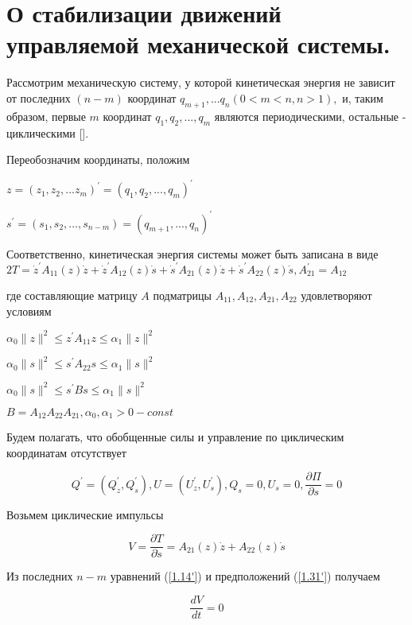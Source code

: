 \section{О стабилизации движений управляемой механической системы.} \label{p13}

Рассмотрим механическую систему, у которой кинетическая энергия не зависит от последних $(n-m)$ координат $q_{m+1},... q_n (0 < m < n, n > 1),$ и, таким образом, первые $m$ координат $q_1, q_2, ... , q_m$ являются периодическими, остальные - циклическими [].

Переобозначим координаты, положим

$z = (z_1, z_2, ... z_m)^{'} = (q_1, q_2, ..., q_m)^{'}$

$s^{'} = (s_1, s_2, ... , s_{n-m}) = (q_{m + 1}, ..., q_n)^{'}$

Соответственно, кинетическая энергия системы может быть записана в виде $2T = \dot z^{'} A_{11} (z) \dot z + \dot z^{'} A_{12} (z) \dot s + \dot s^{'} A_{21} (z) \dot z + \dot s^{'} A_{22} (z) \dot s, A_21^{'} = A_{12}$

где составляющие матрицу $A$ подматрицы $A_{11}, A_{12}, A_{21}, A_{22}$ удовлетворяют условиям 

$\alpha_0 \| z \|^2 \le z^{'} A_{11} z \le \alpha_1  \| z \|^2$

$\alpha_0 \| s \|^2 \le s^{'} A_{22} s \le \alpha_1  \| s \|^2$

$\alpha_0 \| s \|^2 \le s^{'} B s \le \alpha_1  \| s \|^2$

$B = A_{12} A_{22} A_{21}, \alpha_0, \alpha_1 > 0 - const$

Будем полагать, что обобщенные силы и управление по циклическим координатам отсутствует

\begin{equation} \label{1.31'}
Q^{'} = (Q_{z}^{'}, Q_{s}^{'}), U = (U_{z}^{'}, U_{s}^{'}), Q_s = 0, U_s = 0, \frac{\partial \Pi}{\partial s} = 0
\end{equation}

Возьмем циклические импульсы

\begin{equation} \label{1.32'}
V = \frac{\partial T}{\partial \dot s} = A_{21} (z) \dot z + A_{22} (z) \dot s
\end{equation}

Из последних $n - m$ уравнений (\ref{1.14'}) и предположений (\ref{1.31'}) получаем 

\begin{equation} \label{1.33'}
\frac{d V}{d t} = 0
\end{equation}


